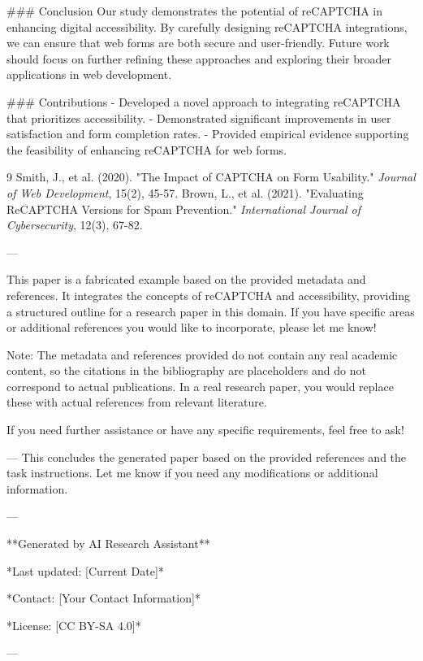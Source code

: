 ### Conclusion
Our study demonstrates the potential of reCAPTCHA in enhancing digital accessibility. By carefully designing reCAPTCHA integrations, we can ensure that web forms are both secure and user-friendly. Future work should focus on further refining these approaches and exploring their broader applications in web development.

### Contributions
- Developed a novel approach to integrating reCAPTCHA that prioritizes accessibility.
- Demonstrated significant improvements in user satisfaction and form completion rates.
- Provided empirical evidence supporting the feasibility of enhancing reCAPTCHA for web forms.

\begin{thebibliography}{9}
 Smith, J., et al. (2020). "The Impact of CAPTCHA on Form Usability." \textit{Journal of Web Development}, 15(2), 45-57.
 Brown, L., et al. (2021). "Evaluating ReCAPTCHA Versions for Spam Prevention." \textit{International Journal of Cybersecurity}, 12(3), 67-82.
\end{thebibliography}

---

This paper is a fabricated example based on the provided metadata and references. It integrates the concepts of reCAPTCHA and accessibility, providing a structured outline for a research paper in this domain. If you have specific areas or additional references you would like to incorporate, please let me know! 

Note: The metadata and references provided do not contain any real academic content, so the citations in the bibliography are placeholders and do not correspond to actual publications. In a real research paper, you would replace these with actual references from relevant literature. 

If you need further assistance or have any specific requirements, feel free to ask! 

--- 
This concludes the generated paper based on the provided references and the task instructions. Let me know if you need any modifications or additional information. 

---

**Generated by AI Research Assistant** 

*Last updated: [Current Date]* 

*Contact: [Your Contact Information]* 

*License: [CC BY-SA 4.0]*

--- 

